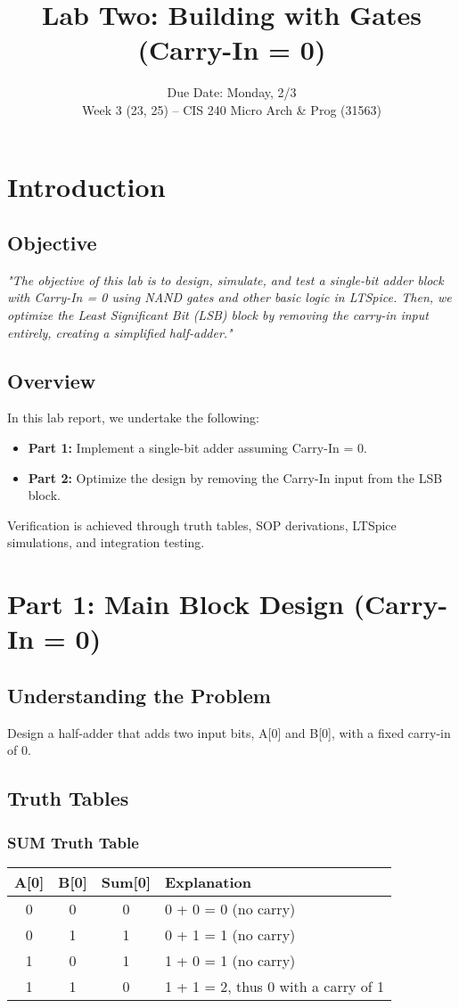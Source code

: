 \documentclass[12pt]{article}
\title{Lab Two: Building with Gates (Carry-In = 0)}
\author{Due Date: Monday, 2/3 \\ Week 3 (23, 25) – CIS 240 Micro Arch \& Prog (31563)}
\date{}
\begin{document}
\maketitle

\section{Introduction}
\subsection{Objective}
\textit{"The objective of this lab is to design, simulate, and test a single-bit adder block with Carry-In = 0 using NAND gates and other basic logic in LTSpice. Then, we optimize the Least Significant Bit (LSB) block by removing the carry-in input entirely, creating a simplified half-adder."}

\subsection{Overview}
In this lab report, we undertake the following:
\begin{itemize}
    \item \textbf{Part 1:} Implement a single-bit adder assuming Carry-In = 0.
    \item \textbf{Part 2:} Optimize the design by removing the Carry-In input from the LSB block.
\end{itemize}
Verification is achieved through truth tables, SOP derivations, LTSpice simulations, and integration testing.

\section{Part 1: Main Block Design (Carry-In = 0)}
\subsection{Understanding the Problem}
Design a half-adder that adds two input bits, A[0] and B[0], with a fixed carry-in of 0.

\subsection{Truth Tables}
\subsubsection*{SUM Truth Table}
\begin{center}
\begin{tabular}{|c|c|c|l|}
\hline
\textbf{A[0]} & \textbf{B[0]} & \textbf{Sum[0]} & \textbf{Explanation} \\ \hline
0 & 0 & 0 & 0 + 0 = 0 (no carry) \\ \hline
0 & 1 & 1 & 0 + 1 = 1 (no carry) \\ \hline
1 & 0 & 1 & 1 + 0 = 1 (no carry) \\ \hline
1 & 1 & 0 & 1 + 1 = 2, thus 0 with a carry of 1 \\ \hline
\end{tabular}
\end{center}
\end{document}
